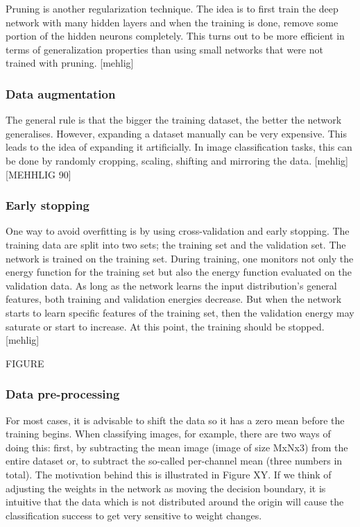 Pruning is another regularization technique. The idea is to first train the deep network with many hidden layers and when the training is done, remove some portion of the hidden neurons completely. This turns out to be more efficient in terms of generalization properties than using small networks that were not trained with pruning. [mehlig]

\subsubsection{Data augmentation}

The general rule is that the bigger the training dataset, the better the network generalises. However, expanding a dataset manually can be very expensive. This leads to the idea of expanding it artificially. In image classification tasks, this can be done by randomly cropping, scaling, shifting and mirroring the data. [mehlig]
[MEHHLIG 90]

\subsubsection{Early stopping}
One way to avoid overfitting is by using cross-validation and early stopping. The training data are split into two sets; the training set and the validation set. The network is trained on the training set. During training, one monitors not only the energy function for the training set but also the energy function evaluated on the validation data. As long as the network learns the input distribution's general features, both training and validation energies decrease. But when the network starts to learn specific features of the training set, then the validation energy may saturate or start to increase. At this point, the training should be stopped. [mehlig]

FIGURE

\subsubsection{Data pre-processing}

For most cases, it is advisable to shift the data so it has a zero mean before the training begins. When classifying images, for example, there are two ways of doing this: first, by subtracting the mean image (image of size MxNx3) from the entire dataset or, to subtract the so-called per-channel mean (three numbers in total). The motivation behind this is illustrated in Figure XY. If we think of adjusting the weights in the network as moving the decision boundary, it is intuitive that the data which is not distributed around the origin will cause the classification success to get very sensitive to weight changes.

